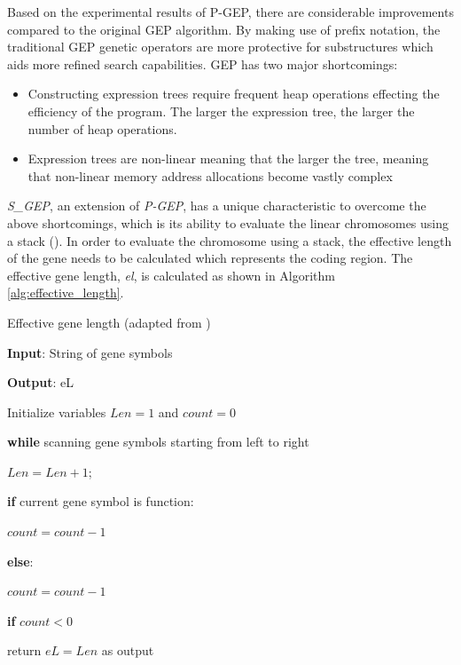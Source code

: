 \noindent Based on the experimental results of P-GEP, there are considerable improvements compared to the original GEP algorithm. By making use of prefix notation, the traditional GEP genetic operators are more protective for substructures which aids more refined search capabilities. GEP has two major shortcomings:

\begin{itemize}
    \item Constructing expression trees require frequent heap operations effecting the efficiency of the program. The larger the expression tree, the larger the number of heap operations.
    \item Expression trees are non-linear meaning that the larger the tree, meaning that non-linear memory address allocations become vastly complex
\end{itemize}

\noindent \textit{S\_GEP}, an extension of \textit{P-GEP}, has a unique characteristic to overcome the above shortcomings, which is its ability to evaluate the linear chromosomes using a stack (\cite{peng2014improved}). In order to evaluate the chromosome using a stack, the effective length of the gene needs to be calculated which represents the coding region. The effective gene length, \textit{el}, is calculated as shown in Algorithm \ref{alg:effective_length}.

\begin{algorithm}
	\caption{Effective gene length (adapted from \cite{peng2014improved})}\label{alg:effective_length}
	\begin{algorithmic}[1]
	\item \textbf{Input}: String of gene symbols
	\item \textbf{Output}: eL
	\item Initialize variables $Len=1$ and $count=0$
	\item \textbf{while} scanning gene symbols starting from left to right
	\item \quad $Len = Len + 1$;
	\item \quad \textbf{if} current gene symbol is function:
	\item \quad \quad $count = count - 1$
	\item \quad \textbf{else}:
	\item \quad \quad $count = count - 1$
	\item \quad \textbf{if} $count < 0$
	\item \quad \quad return $eL=Len$ as output
\end{algorithmic}
\end{algorithm}

